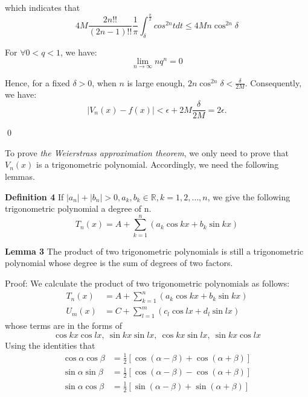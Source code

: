 \documentclass[12pt]{article}
\begin{document}
which indicates that
\begin{equation*}
4M\frac{2n!!}{(2n-1)!!}\frac{1}{\pi}\int_{\delta}^{\frac{\pi}{2}}cos^{2n}tdt\leq 4Mn\cos^{2n}\delta
\end{equation*}
\par For $\forall 0<q<1$, we have:
\begin{equation*}
\lim_{n\to\infty}nq^{n}=0
\end{equation*}
\par Hence, for a fixed $\delta>0$, when $n$ is large enough, $2n\cos^{2n}\delta<\frac{\delta}{2M}$. Consequently, we have:
\begin{equation*}
|V_n(x)-f(x)|<\epsilon+2M\frac{\delta}{2M}=2\epsilon.
\end{equation*}
\par \qed
\par To prove \emph{the Weierstrass approximation theorem}, we only need to prove that $V_n(x)$ is a trigonometric polynomial. Accordingly, we need the following lemmas.
\par {\textbf{Definition 4}} If $|a_n|+|b_n|>0, a_k, b_k\in\mathbb{R}, k=1,2,\ldots,n$, we give the following trigonometric polynomial a degree of n.
\begin{equation*}
T_n(x)=A+\sum_{k=1}^{n}(a_k\cos{kx}+b_k\sin{kx})
\end{equation*}
\par {\textbf{Lemma 3}} The product of two trigonometric polynomials is still a trigonometric polynomial whose degree is the sum of degrees of two factors.
\par Proof: We calculate the product of two trigonometric polynomials as follows:
\[
\begin{split}
T_n(x)&=A+\sum_{k=1}^{n}(a_k\cos{kx}+b_k\sin{kx})\\
U_m(x)&=C+\sum_{l=1}^{m}(c_l\cos{lx}+d_l\sin{lx})
\end{split}
\]
whose terms are in the forms of
\begin{equation*}
\cos{kx}\cos{lx},\ \sin{kx}\sin{lx},\ \cos{kx}\sin{lx},\ \sin{kx}\cos{lx}
\end{equation*} 
Using the identities that
\[
\begin{split}
\cos{\alpha}\cos{\beta}&=\frac{1}{2}[\cos(\alpha-\beta)+\cos(\alpha+\beta)]\\
\sin{\alpha}\sin{\beta}&=\frac{1}{2}[\cos(\alpha-\beta)-\cos(\alpha+\beta)]\\
\sin{\alpha}\cos{\beta}&=\frac{1}{2}[\sin(\alpha-\beta)+\sin(\alpha+\beta)]
\end{split}
\]
\end{document}
